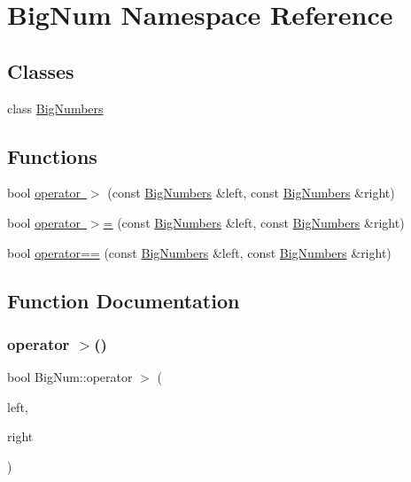 \hypertarget{namespace_big_num}{}\section{Big\+Num Namespace Reference}
\label{namespace_big_num}
\subsection*{Classes}
\begin{DoxyCompactItemize}
\item 
class \mbox{\hyperlink{class_big_num_1_1_big_numbers}{Big\+Numbers}}
\end{DoxyCompactItemize}
\subsection*{Functions}
\begin{DoxyCompactItemize}
\item 
bool \mbox{\hyperlink{namespace_big_num_aef9ae309a192a08c9bba63ec2bc13c25}{operator $>$}} (const \mbox{\hyperlink{class_big_num_1_1_big_numbers}{Big\+Numbers}} \&left, const \mbox{\hyperlink{class_big_num_1_1_big_numbers}{Big\+Numbers}} \&right)
\item 
bool \mbox{\hyperlink{namespace_big_num_a21b831b8aa13287c1465e13437f92b8d}{operator $>$=}} (const \mbox{\hyperlink{class_big_num_1_1_big_numbers}{Big\+Numbers}} \&left, const \mbox{\hyperlink{class_big_num_1_1_big_numbers}{Big\+Numbers}} \&right)
\item 
bool \mbox{\hyperlink{namespace_big_num_ac79a01b5674ec11020f9f848a1e9c343}{operator==}} (const \mbox{\hyperlink{class_big_num_1_1_big_numbers}{Big\+Numbers}} \&left, const \mbox{\hyperlink{class_big_num_1_1_big_numbers}{Big\+Numbers}} \&right)
\end{DoxyCompactItemize}


\subsection{Function Documentation}
\mbox{\label{namespace_big_num_aef9ae309a192a08c9bba63ec2bc13c25}} 
\subsubsection{\texorpdfstring{operator $>$()}{operator >()}}
{\footnotesize\ttfamily bool Big\+Num\+::operator $>$ (\begin{DoxyParamCaption}\item[{const \mbox{\hyperlink{class_big_num_1_1_big_numbers}{Big\+Numbers}} \&}]{left,  }\item[{const \mbox{\hyperlink{class_big_num_1_1_big_numbers}{Big\+Numbers}} \&}]{right }\end{DoxyParamCaption})}


